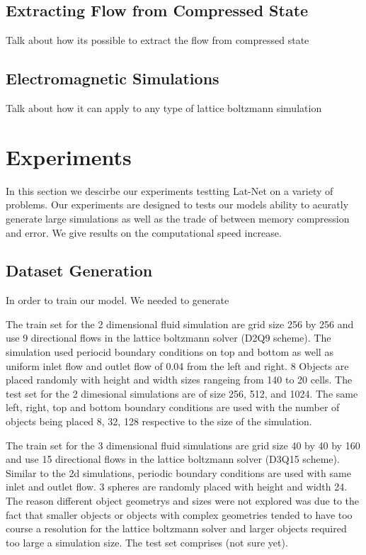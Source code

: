 \documentclass{article}
\begin{document}
\subsection{Extracting Flow from Compressed State}

Talk about how its possible to extract the flow from compressed state

\subsection{Electromagnetic Simulations}

Talk about how it can apply to any type of lattice boltzmann simulation

\section{Experiments}

In this section we descirbe our experiments testting Lat-Net on a variety of problems. Our experiments are designed to tests our models ability to acuratly generate large simulations as well as the trade of between memory compression and error. We give results on the computational speed increase.

\subsection{Dataset Generation}
In order to train our model. We needed to generate 


The train set for the 2 dimensional fluid simulation are grid size 256 by 256 and use 9 directional flows in the lattice boltzmann solver (D2Q9 scheme). The simulation used periocid boundary conditions on top and bottom as well as uniform inlet flow and outlet flow of 0.04 from the left and right. 8 Objects are placed randomly with height and width sizes rangeing from 140 to 20 cells. The test set for the 2 dimesional simulations are of size 256, 512, and 1024. The same left, right, top and bottom boundary conditions are used with the number of objects being placed 8, 32, 128 respective to the size of the simulation. 

The train set for the 3 dimensional fluid simulations are grid size 40 by 40 by 160 and use 15 directional flows in the lattice boltzmann solver (D3Q15 scheme). Similar to the 2d simulations, periodic boundary conditions are used with same inlet and outlet flow. 3 spheres are randomly placed with height and width 24. The reason different object geometrys and sizes were not explored was due to the fact that smaller objects or objects with complex geometries tended to have too course a resolution for the lattice boltzmann solver and larger objects required too large a simulation size. The test set comprises (not sure yet).
\end{document}
